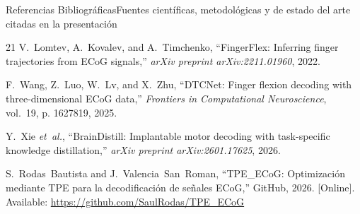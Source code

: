\begin{frame}[allowframebreaks]{Referencias Bibliogr\'aficas}{Fuentes cient\'ificas, metodol\'ogicas y de estado del arte citadas en la presentaci\'on}
\begin{thebibliography}{21}
    V.~Lomtev, A.~Kovalev, and A.~Timchenko, ``{FingerFlex}: Inferring finger trajectories from {ECoG} signals,'' \emph{arXiv preprint arXiv:2211.01960}, 2022.

    F.~Wang, Z.~Luo, W.~Lv, and X.~Zhu, ``{DTCNet}: Finger flexion decoding with three-dimensional {ECoG} data,'' \emph{Frontiers in Computational Neuroscience}, vol.~19, p. 1627819, 2025.

    Y.~Xie \emph{et~al.}, ``{BrainDistill}: Implantable motor decoding with task-specific knowledge distillation,'' \emph{arXiv preprint arXiv:2601.17625}, 2026.

    S.~Rodas~Bautista and J.~Valencia~San~Roman, ``{TPE\_ECoG}: Optimizaci\'on mediante {TPE} para la decodificaci\'on de se\~nales {ECoG},'' GitHub, 2026. [Online]. Available: \url{https://github.com/SaulRodas/TPE_ECoG}

  \end{thebibliography}
\end{frame}
\bibslidefalse
